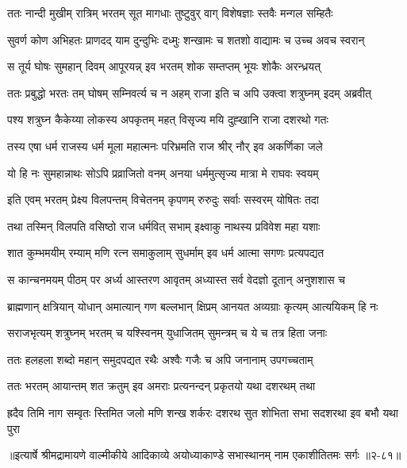 
\twolineshloka
{ततः नान्दी मुखीम् रात्रिम् भरतम् सूत मागधाः}
{तुष्टुवुर् वाग् विशेषज्ञाः स्तवैः मन्गल सम्हितैः} %

\twolineshloka
{सुवर्ण कोण अभिहतः प्राणदद् याम दुन्दुभिः}
{दध्मुः शन्खामः च शतशो वाद्यामः च उच्च अवच स्वरान्} %

\twolineshloka
{स तूर्य घोषः सुमहान् दिवम् आपूरयन्न् इव}
{भरतम् शोक सम्तप्तम् भूयः शोकैः अरन्ध्रयत्} %

\twolineshloka
{ततः प्रबुद्धो भरतः तम् घोषम् सम्निवर्त्य च}
{न अहम् राजा इति च अपि उक्त्वा शत्रुघ्नम् इदम् अब्रवीत्} %

\twolineshloka
{पश्य शत्रुघ्न कैकेय्या लोकस्य अपकृतम् महत्}
{विसृज्य मयि दुह्खानि राजा दशरथो गतः} %

\twolineshloka
{तस्य एषा धर्म राजस्य धर्म मूला महात्मनः}
{परिभ्रमति राज श्रीर् नौर् इव अकर्णिका जले} %

\twolineshloka
{यो हि नः सुमहान्नाथः सोऽपि प्रव्राजितो वनम्}
{अनया धर्ममुत्सृज्य मात्रा मे राघवः स्वयम्} %

\twolineshloka
{इति एवम् भरतम् प्रेक्ष्य विलपन्तम् विचेतनम्}
{कृपणम् रुरुदुः सर्वाः सस्वरम् योषितः तदा} %

\twolineshloka
{तथा तस्मिन् विलपति वसिष्ठो राज धर्मवित्}
{सभाम् इक्ष्वाकु नाथस्य प्रविवेश महा यशाः} %

\twolineshloka
{शात कुम्भमयीम् रम्याम् मणि रत्न समाकुलाम्}
{सुधर्माम् इव धर्म आत्मा सगणः प्रत्यपद्यत} %

\twolineshloka
{स कान्चनमयम् पीठम् पर अर्ध्य आस्तरण आवृतम्}
{अध्यास्त सर्व वेदज्ञो दूतान् अनुशशास च} %

\twolineshloka
{ब्राह्मणान् क्षत्रियान् योधान् अमात्यान् गण बल्लभान्}
{क्षिप्रम् आनयत अव्यग्राः कृत्यम् आत्ययिकम् हि नः} %

\twolineshloka
{सराजभृत्यम् शत्रुघ्नम् भरतम् च यश्स्विनम्}
{युधाजितम् सुमन्त्रम् च ये च तत्र हिता जनाः} %

\twolineshloka
{ततः हलहला शब्दो महान् समुदपद्यत}
{रथैः अश्वैः गजैः च अपि जनानाम् उपगच्चताम्} %

\twolineshloka
{ततः भरतम् आयान्तम् शत क्रतुम् इव अमराः}
{प्रत्यनन्दन् प्रकृतयो यथा दशरथम् तथा} %

\fourlineindentedshloka
{ह्रदैव तिमि नाग सम्वृतः}
{स्तिमित जलो मणि शन्ख शर्करः}
{दशरथ सुत शोभिता सभा}
{सदशरथा इव बभौ यथा पुरा} %


॥इत्यार्षे श्रीमद्रामायणे वाल्मीकीये आदिकाव्ये अयोध्याकाण्डे सभास्थानम् नाम एकाशीतितमः सर्गः ॥२-८१॥
